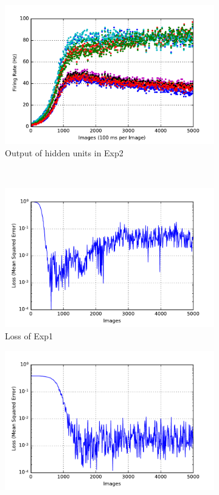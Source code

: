 \begin{figure}
\begin{subfigure}[t]{0.4\textwidth}
		\includegraphics[width=\textwidth]{pics_sdlm/15_exp_SRBM_teach_long/exp2_hid_s.pdf}
		\caption{Output of hidden units in Exp2}
	\end{subfigure}\\
	\begin{subfigure}[t]{0.4\textwidth}
		\includegraphics[width=\textwidth]{pics_sdlm/15_exp_SRBM_teach_long/exp1_mse_nons.pdf}
		\caption{Loss of Exp1}
	\end{subfigure}
	\begin{subfigure}[t]{0.4\textwidth}
		\includegraphics[width=\textwidth]{pics_sdlm/15_exp_SRBM_teach_long/exp2_mse_nons.pdf}

\end{subfigure}
\end{figure}
